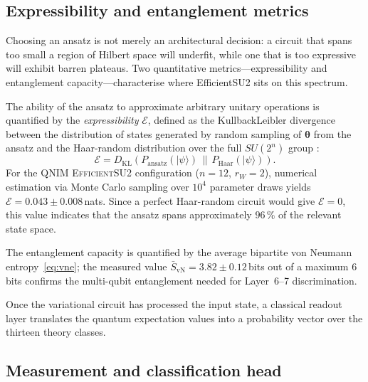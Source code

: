 \documentclass[11pt,a4paper, english]{book}
\theoremstyle{plain}
\theoremstyle{definition}
\numberwithin{equation}{chapter}
\numberwithin{figure}{chapter}
\numberwithin{table}{chapter}
\begin{document}
\subsection{Expressibility and entanglement metrics}
\label{subsec:expressibility}

Choosing an ansatz is not merely an architectural decision: a circuit that spans
too small a region of Hilbert space will underfit, while one that is too expressive
will exhibit barren plateaus. Two quantitative metrics—expressibility and entanglement
capacity—characterise where EfficientSU2 sits on this spectrum.

The ability of the ansatz to approximate arbitrary unitary operations is
quantified by the \emph{expressibility} $\mathcal{E}$, defined as the
KullbackLeibler divergence between the distribution of states generated
by random sampling of $\boldsymbol{\theta}$ from the ansatz and the
Haar-random distribution over the full $SU(2^n)$ group \cite{Sim_2019}:
\begin{equation}
  \label{eq:expressibility}
  \mathcal{E} = D_\mathrm{KL}\!\left(
    P_\mathrm{ansatz}(|\psi\rangle)\,\|\,P_\mathrm{Haar}(|\psi\rangle)
  \right).
\end{equation}
For the QNIM \textsc{EfficientSU2} configuration ($n=12$, $r_W=2$),
numerical estimation via Monte Carlo sampling over $10^4$ parameter
draws yields $\mathcal{E} = 0.043 \pm 0.008$\,nats.  Since a perfect
Haar-random circuit would give $\mathcal{E} = 0$, this value indicates
that the ansatz spans approximately $96\,\%$ of the relevant state space.

The entanglement capacity is quantified by the average bipartite
von Neumann entropy~\eqref{eq:vne}; the measured value 
$\bar{S}_\mathrm{vN} = 3.82 \pm 0.12$\,bits out of a maximum 
$6$\,bits confirms the multi-qubit entanglement needed for 
Layer~6--7 discrimination.

Once the variational circuit has processed the input state, a classical readout
layer translates the quantum expectation values into a probability vector over
the thirteen theory classes.

\subsection{Measurement and classification head}
\label{subsec:measurement}
\end{document}
